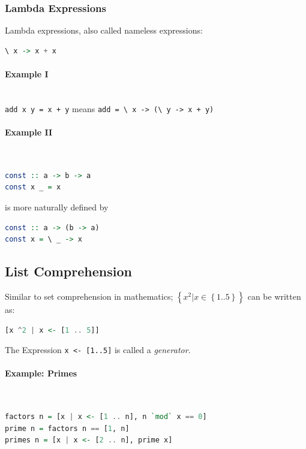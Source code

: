 \subsubsection{Lambda Expressions}
Lambda expressions, also called nameless expressions:
\begin{lstlisting}[language=Haskell]
\ x -> x + x
\end{lstlisting}

\paragraph{Example I} \hfill \\
\lstinline|add x y = x + y| means \lstinline|add = \ x -> (\ y -> x + y)|

\paragraph{Example II} \hfill \\
\begin{lstlisting}[language=Haskell]
const :: a -> b -> a
const x _ = x 
\end{lstlisting}
is more naturally defined by

\begin{lstlisting}[language=Haskell]
const :: a -> (b -> a)
const x = \ _ -> x
\end{lstlisting}


\subsection{List Comprehension}

Similar to set comprehension in mathematics; $\left\{x^2 | x \in \left\{1..5\right\}\right\}$ can be written as:

\begin{lstlisting}[language=Haskell]
[x ^2 | x <- [1 .. 5]]
\end{lstlisting}

The Expression \lstinline|x <- [1..5]| is called a \emph{generator}.


\paragraph{Example: Primes} \hfill \\
\begin{lstlisting}[language=Haskell]
factors n = [x | x <- [1 .. n], n `mod` x == 0]
prime n = factors n == [1, n]
primes n = [x | x <- [2 .. n], prime x]
\end{lstlisting}


